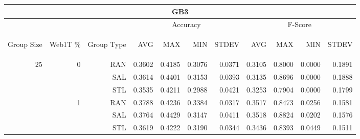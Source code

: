 \begin{center}
\begin{table}[htbp] 
 \begin{center}
\begin{tabular}{ | r | r | r | r | r | r | r | r | r | r | r |}
\hline
\multicolumn{11}{|c|}{GB3}\\
\hline
 & & & \multicolumn{4}{|c|}{Accuracy} & \multicolumn{4}{|c|}{F-Score}\\ \cline{4-11}
\begin{sideways}Group Size\end{sideways} & \begin{sideways}Web1T \%\end{sideways} & \begin{sideways}Group Type\end{sideways} & \begin{sideways}AVG\end{sideways} & \begin{sideways}MAX\end{sideways} & \begin{sideways}MIN\end{sideways} & \begin{sideways}STDEV\end{sideways} & \begin{sideways}AVG\end{sideways} & \begin{sideways}MAX\end{sideways} & \begin{sideways}MIN\end{sideways} & \begin{sideways}STDEV\end{sideways}\\
\hline
\multirow{18}{*}{25}
 & \multirow{3}{*}{0} & RAN & 0.3602 & 0.4185 & 0.3076 & 0.0371 & 0.3105 & 0.8000 & 0.0000 & 0.1891\\ \cline{3-11}
 &   & SAL & 0.3614 & 0.4401 & 0.3153 & 0.0393 & 0.3135 & 0.8696 & 0.0000 & 0.1888\\ \cline{3-11}
 &   & STL & 0.3535 & 0.4211 & 0.2988 & 0.0421 & 0.3253 & 0.7904 & 0.0000 & 0.1799\\ \cline{2-11}
 & \multirow{3}{*}{1} & RAN & 0.3788 & 0.4236 & 0.3384 & 0.0317 & 0.3517 & 0.8473 & 0.0256 & 0.1581\\ \cline{3-11}
 &   & SAL & 0.3764 & 0.4429 & 0.3147 & 0.0411 & 0.3518 & 0.8824 & 0.0202 & 0.1576\\ \cline{3-11}
 &   & STL & 0.3619 & 0.4222 & 0.3190 & 0.0344 & 0.3436 & 0.8393 & 0.0449 & 0.1511\\ \cline{2-11}

\end{tabular}
\end{center}
\end{table}
\end{center}
